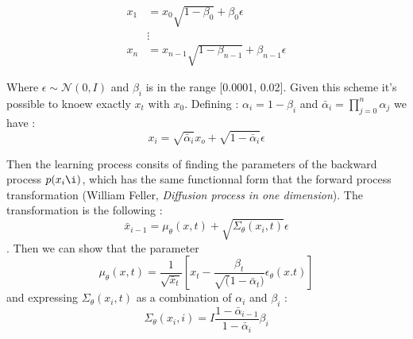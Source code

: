 \documentclass[11pt,a4paper]{report}
\begin{document}
\begin{multicols*}{2}
    \begin{align*}
        x_{1} & = x_0  \sqrt{1 - \beta_0} + \beta_0 \epsilon             \\
              & \vdots                                                   \\
        x_{n} & = x_{n-1}  \sqrt{1 - \beta_{n-1}} + \beta_{n-1} \epsilon
    \end{align*}

    Where $\epsilon \sim \mathcal{N} (0,I)$ and $\beta_i$ is in the range [0.0001, 0.02]. Given this scheme it's possible to knoew exactly $x_t$ with $x_0$.
    Defining : $\alpha_i = 1 - \beta_i$ and $\bar \alpha_i = \prod_{j=0}^{n} \alpha_j$ we have :
    $$ x_i = \sqrt{\bar \alpha_i}x_o + \sqrt{1 - \bar \alpha_i} \epsilon$$

    Then the learning process consits of finding the parameters of the backward process $p(x_i\i)$, which has the same functionnal form that the forward process transformation
    (William Feller, \emph{Diffusion process in one dimension}). The transformation is the following :
    $$\bar x_{i-1} = \mu_\theta (x,t) + \sqrt{\Sigma_\theta (x_i,t)}\epsilon$$. Then we can show that the parameter
    $$\mu_\theta (x,t) = \frac{1}{\sqrt{\bar x_t}} [ x_t - \frac{\beta_t}{\sqrt(1 - \bar \alpha_t)} \epsilon_\theta (x.t)]$$ and expressing $\Sigma_\theta (x_i,t)$ as a combination of $\alpha_i$ and $\beta_i$ : $$\Sigma_\theta (x_i,i) = I \frac{1 - \bar \alpha_{i-1}}{1 - \bar \alpha_i}\beta_i$$

\end{multicols*}
\end{document}
